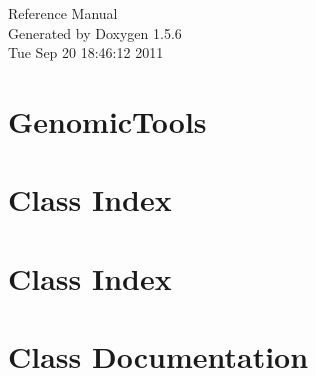 \documentclass[a4paper]{book}
\begin{document}
\begin{titlepage}
\vspace*{7cm}
\begin{center}
{\Large Reference Manual}\\
\vspace*{1cm}
{\large Generated by Doxygen 1.5.6}\\
\vspace*{0.5cm}
{\small Tue Sep 20 18:46:12 2011}\\
\end{center}
\end{titlepage}
\clearemptydoublepage
{}
\tableofcontents
\clearemptydoublepage
{}
\chapter{GenomicTools}
\label{index}\hypertarget{index}{}
\chapter{Class Index}

\chapter{Class Index}

\chapter{Class Documentation}

















\printindex
\end{document}
